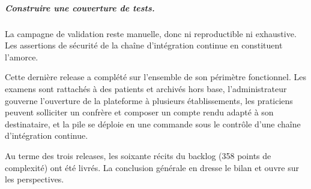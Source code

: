 \subparagraph{Construire une couverture de tests.} La campagne de validation reste
manuelle, donc ni reproductible ni exhaustive. Les assertions de sécurité de la chaîne
d'intégration continue en constituent l'amorce.


Cette dernière release a complété \hypnoria{} sur l'ensemble de son périmètre fonctionnel.
Les examens sont rattachés à des patients et archivés hors base, l'administrateur gouverne
l'ouverture de la plateforme à plusieurs établissements, les praticiens peuvent solliciter
un confrère et composer un compte rendu adapté à son destinataire, et la pile se déploie en
une commande sous le contrôle d'une chaîne d'intégration continue.

Au terme des trois releases, les soixante récits du backlog (358 points de complexité)
ont été livrés. La conclusion générale en dresse le bilan et ouvre sur les perspectives.
